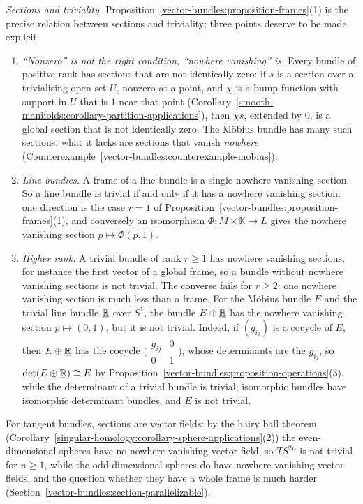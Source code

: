 \begin{remark}\label{vector-bundles:remark-sections-triviality}
\emph{Sections and triviality.} Proposition~\ref{vector-bundles:proposition-frames}(1) is the precise relation between sections and triviality; three points deserve to be made explicit.
\begin{enumerate}
\item \emph{``Nonzero'' is not the right condition, ``nowhere vanishing'' is.} Every bundle of positive rank has sections that are not identically zero: if $s$ is a section over a trivialising open set $U$, nonzero at a point, and $\chi$ is
a bump function with support in $U$ that is $1$ near that point (Corollary~\ref{smooth-manifolds:corollary-partition-applications}), then $\chi s$, extended by $0$, is a global section that is not identically zero. The M\"obius
bundle has many such sections; what it lacks are sections that vanish \emph{nowhere} (Counterexample~\ref{vector-bundles:counterexample-mobius}).
\item \emph{Line bundles.} A frame of a line bundle is a single nowhere vanishing section. So a line bundle is trivial if and only if it has a nowhere vanishing section: one direction is the case $r = 1$ of
Proposition~\ref{vector-bundles:proposition-frames}(1), and conversely an isomorphism $\Phi \colon M \times \mathbb{K} \to L$ gives the nowhere vanishing section $p \mapsto \Phi(p, 1)$.
\item \emph{Higher rank.} A trivial bundle of rank $r \geq 1$ has nowhere vanishing sections, for instance the first vector of a global frame, so a bundle without nowhere vanishing sections is not trivial. The converse fails for
$r \geq 2$: one nowhere vanishing section is much less than a frame. For the M\"obius bundle $E$ and the trivial line bundle $\underline{\mathbb{R}}$ over $S^1$, the bundle $E \oplus \underline{\mathbb{R}}$ has the nowhere vanishing section
$p \mapsto (0, 1)$, but it is not trivial. Indeed, if $(g_{ij})$ is a cocycle of $E$, then $E \oplus \underline{\mathbb{R}}$ has the cocycle $\bigl(\begin{smallmatrix}g_{ij} & 0\\ 0 & 1\end{smallmatrix}\bigr)$, whose determinants are the
$g_{ij}$, so $\det(E \oplus \underline{\mathbb{R}}) \cong E$ by Proposition~\ref{vector-bundles:proposition-operations}(3), while the determinant of a trivial bundle is trivial; isomorphic bundles have isomorphic determinant bundles, and $E$ is
not trivial.
\end{enumerate}
For tangent bundles, sections are vector fields: by the hairy ball theorem (Corollary~\ref{singular-homology:corollary-sphere-applications}(2)) the even-dimensional spheres have no nowhere vanishing vector field, so
$TS^{2n}$ is not trivial for $n \geq 1$, while the odd-dimensional spheres do have nowhere vanishing vector fields, and the question whether they have a whole frame is much harder
(Section~\ref{vector-bundles:section-parallelizable}).
\end{remark}

